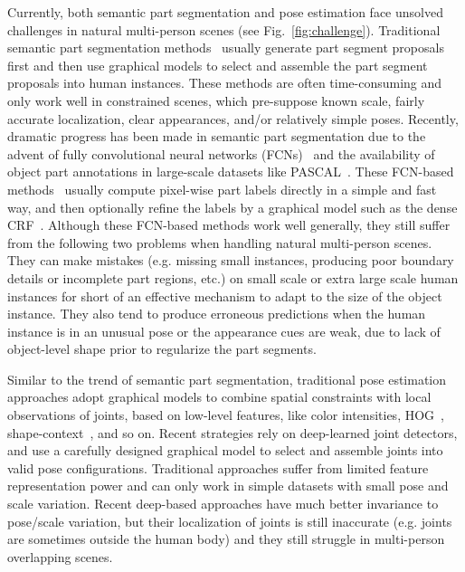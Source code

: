 Currently, both semantic part segmentation and pose estimation face unsolved challenges in natural multi-person scenes (see Fig.~\ref{fig:challenge}).
Traditional semantic part segmentation methods~\cite{bo2011shape,eslami2012generative,yamaguchi2012parsing,dong2013deformable,zhu2011max} usually generate part segment proposals first and then use graphical models to select and assemble the part segment proposals into human instances. These methods are often time-consuming and only work well in constrained scenes, which pre-suppose known scale, fairly accurate localization, clear appearances, and/or relatively simple poses. Recently, dramatic progress has been made in semantic part segmentation due to the advent of fully convolutional neural networks (FCNs)~\cite{long2015fully} and the availability of object part annotations in large-scale datasets like PASCAL~\cite{chen2014detect}. These FCN-based methods~\cite{hariharan2015hypercolumns,wang2015joint,chen2016deeplab} usually compute pixel-wise part labels directly in a simple and fast way, and then optionally refine the labels by a graphical model such as the dense CRF~\cite{krahenbuhl2011efficient}. Although these FCN-based methods work well generally, they still suffer from the following two problems when handling natural multi-person scenes. They can make mistakes (e.g. missing small instances, producing poor boundary details or incomplete part regions, etc.) on small scale or extra large scale human instances for short of an effective mechanism to adapt to the size of the object instance. They also tend to produce erroneous predictions when the human instance is in an unusual pose or the appearance cues are weak, due to lack of object-level shape prior to regularize the part segments.

Similar to the trend of semantic part segmentation, traditional pose estimation approaches adopt graphical models to combine spatial constraints with local observations of joints, based on low-level features, like color intensities, HOG~\cite{dalal2005histograms}, shape-context~\cite{belongie2001shape}, and so on. Recent strategies rely on deep-learned joint detectors, and use a carefully designed graphical model to select and assemble joints into valid pose
configurations. Traditional approaches suffer from limited feature representation power and can only work in simple datasets with small pose and scale variation. Recent deep-based approaches have much better invariance to pose/scale variation, but their localization of joints is still inaccurate (e.g. joints are sometimes outside the human body) and they still struggle in multi-person overlapping scenes.

